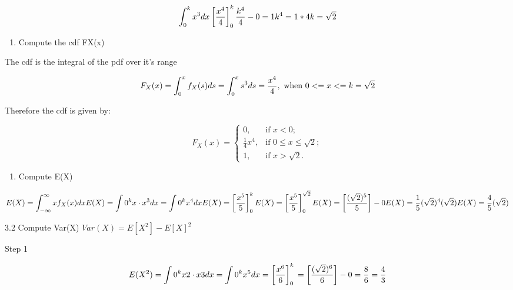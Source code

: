 \documentclass[
  letterpaper,
  DIV=11,
  numbers=noendperiod]{scrreprt}
\providecommand{\tightlist}{%
  \setlength{\itemsep}{0pt}\setlength{\parskip}{0pt}}\usepackage{longtable,booktabs,array}
\begin{document}
\[
\int_{0}^{k} x^3 dx \\
\left[ \frac{x^4}{4} \right]_0^k \\ 
\frac{k^4}{4}- 0 = 1 \\
k^4 = 1*4 \\
k = \sqrt{2}
\]

\begin{enumerate}
\def\labelenumi{\arabic{enumi}.}
\setcounter{enumi}{1}
\tightlist
\item
  Compute the cdf FX(x)
\end{enumerate}

The cdf is the integral of the pdf over it's range

\[
F_X(x)= \int_{0}^{x} f_X(s) ds \\
= \int_{0}^{x} s^3 ds \\
= \frac{x^4}{4}, \text{ when } 0<=x<=k = \sqrt{2}   \\ 
\]

Therefore the cdf is given by:

\[
F_X(x) = 
\begin{cases} 
0, & \text{if  } x < 0; \\
\frac{1}{4}x^4, & \text{if  } 0 \leq x \leq \sqrt{2}; \\
1, & \text{if  } x > \sqrt{2}.
\end{cases}
\]

\begin{enumerate}
\def\labelenumi{\arabic{enumi}.}
\setcounter{enumi}{2}
\tightlist
\item
  Compute E(X)
\end{enumerate}

\[
E(X) = \int_{-\infty}^{\infty} x f_X(x) dx \\
E(X) = \int{0}^{k} x \cdot x^3 dx = \int{0}^{k} x^4 dx\\
E(X) = \left[ \frac{x^5}{5} \right]_0^k \\
E(X) = \left[ \frac{x^5}{5} \right]_0^{\sqrt 2} \\
E(X) = \left[ \frac{(\sqrt 2)^5}{5} \right] - 0 \\
E(X) = \frac{1}{5}(\sqrt 2)^4 (\sqrt 2) \\ 
E(X) = \frac{4}{5}(\sqrt 2)
\]

3.2 Compute Var(X) \(Var(X) = E[X^2] -E[X]^2\)

Step 1

\[
E(X^2) = \int{0}^{k} x2\cdot x3 dx \\
= \int{0}^{k} x^5 dx \\
= \left[ \frac{x^6}{6} \right]_0^k \\
= \left[ \frac{(\sqrt 2)^6}{6} \right] - 0 \\
= \frac{8}{6} = \frac{4}{3} 
\]
\end{document}
